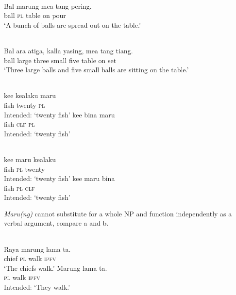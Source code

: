 \ea%
\label{ex:9:15}
 \\
\gll  Bal  marung mea tang pering. \\
 ball \textsc{pl} table on pour   \\
\glt `A bunch of balls are spread out on the table.'
\z







\ea %
\label{bkm:Ref334530759}
 \\
\gll Bal ara atiga, kalla yasing, mea tang {ti}{{\textglotstop}}{ang.} \\
 ball large three small five table on  set \\
\glt `Three large balls and five small balls are sitting on the table.'
\z



\ea%
\label{ex:9:17}
 \\
\ea
\gll *ke{\textglotstop}e kealaku maru \\
   fish  twenty \textsc{pl} \\
\glt Intended: \textsc{`}twenty fish'
\ex
\gll *ke{\textglotstop}e bina maru \\
 fish \textsc{clf} \textsc{pl} \\
\glt Intended: `twenty fish'
\z
\z


\ea%
\label{ex:9:18}
 \\
\ea
\gll *ke{\textglotstop}e  maru kealaku \\
   fish  \textsc{pl} twenty \\
\glt Intended: `twenty fish'
\ex 
\gll *ke{\textglotstop}e maru  bina \\
 fish \textsc{pl} \textsc{clf} \\
 \glt Intended: `twenty fish'
\z
\z

\textit{Maru(ng)} cannot substitute for a whole NP and function independently as a verbal argument, compare a and b.


\ea%
\label{ex:9:19}
 \\
\ea
\gll  Raya marung lama ta. \\
   chief \textsc{pl} walk \textsc{ipfv}  \\
\glt `The chiefs walk.'
\ex
\gll *Marung lama ta. \\
  \textsc{pl} walk \textsc{ipfv}  \\
\glt Intended: `They walk.'
\z
\z


